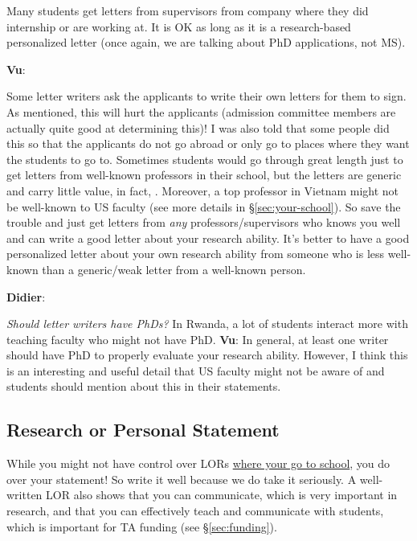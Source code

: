 \documentclass[11pt]{article}
\newenvironment{commentbox}[1][]{
\small
    \begin{cbox}
    \textbf{#1}: 
 }{
   \end{cbox}
}
\newcommand{\red}[1]{{\color{red}{#1}}}
\begin{document}
Many students get letters from supervisors from company where they did internship or are
working at. It is OK as long as it is a research-based personalized
letter (once again, we are talking about PhD applications, not MS).


\begin{commentbox}[Vu]
Some letter writers ask the applicants to write their own letters for them to sign. As mentioned, this will hurt the applicants (admission committee members are actually quite good at determining this)! I was also told that some people did this so that the applicants do not go abroad or only go to places where they want the students to go to.
\tcblower
Sometimes students would go through great length just to get letters from well-known professors in their school, but the letters are generic and carry little value, in fact, \red{red flags}. Moreover, a top professor in Vietnam might not be well-known to US faculty (see more details in \S\ref{sec:your-school}). So save the trouble and just get letters from \emph{any} professors/supervisors who knows you well and can write a good letter about your research ability. It's better to have a good personalized
letter about your own research ability from someone who is less
well-known than a generic/weak letter from a well-known person.
\end{commentbox}

\begin{commentbox}[Didier]
\emph{Should letter writers have PhDs?}  In Rwanda, a lot of students interact more with teaching faculty who might not have PhD.
\tcblower
\textbf{Vu}: In general, at least one writer should have PhD to properly evaluate your research ability.  However, I think this is an interesting and useful detail that US faculty might not be aware of and students should mention about this in their statements.
\end{commentbox}

\subsection{Research or Personal Statement}\label{sec:research-statement}

While you might not have control over LORs \hyperref[sec:your-school]{where your go to school}, you do over your
statement! So write it well because we do take it seriously.
A well-written LOR also shows that you can communicate, which is very important in research, and that you can effectively teach and communicate with students, which is important for TA funding (see \S\ref{sec:funding}).
\end{document}
